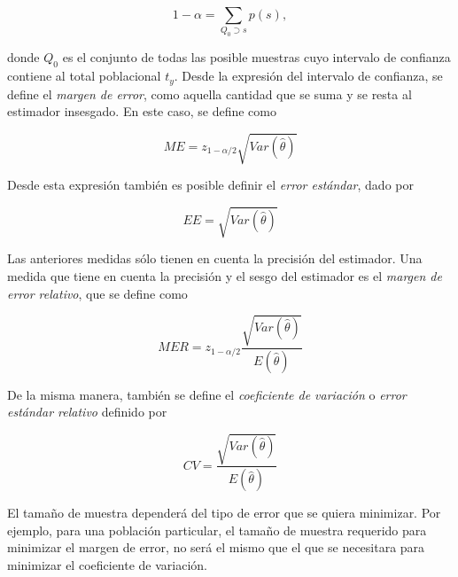 \documentclass[
  12pt,
  spanish,
]{book}
\begin{document}
\begin{equation*}
1-\alpha=\sum_{Q_0 \supset s}p(s),
\end{equation*}

donde \(Q_0\) es el conjunto de todas las posible muestras cuyo intervalo de confianza contiene al total poblacional \(t_y\). Desde la expresión del intervalo de confianza, se define el \emph{margen de error}, como aquella cantidad que se suma y se resta al estimador insesgado. En este caso, se define como

\begin{equation}
ME = z_{1-\alpha / 2}\sqrt{ Var(\hat{\theta})}
\end{equation}

Desde esta expresión también es posible definir el \emph{error estándar}, dado por

\begin{equation}
EE = \sqrt{ Var(\hat{\theta})}
\end{equation}

Las anteriores medidas sólo tienen en cuenta la precisión del estimador. Una medida que tiene en cuenta la precisión y el sesgo del estimador es el \emph{margen de error relativo}, que se define como

\begin{equation}
MER = z_{1-\alpha / 2}\frac{\sqrt{ Var(\hat{\theta})}}{E(\hat{\theta})}
\end{equation}

De la misma manera, también se define el \emph{coeficiente de variación} o \emph{error estándar relativo} definido por

\begin{equation}
CV =  \frac{\sqrt{ Var(\hat{\theta})}}{E(\hat{\theta})}
\end{equation}

El tamaño de muestra dependerá del tipo de error que se quiera minimizar. Por ejemplo, para una población particular, el tamaño de muestra requerido para minimizar el margen de error, no será el mismo que el que se necesitara para minimizar el coeficiente de variación.
\end{document}
